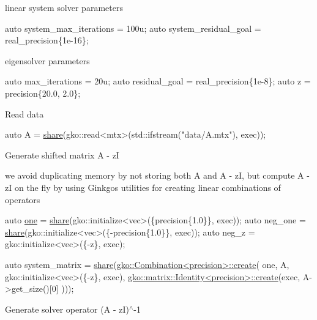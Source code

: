 linear system solver parameters


\begin{DoxyCode}
\textcolor{keyword}{auto} system\_max\_iterations = 100u;
\textcolor{keyword}{auto} system\_residual\_goal = real\_precision\{1e-16\};
\end{DoxyCode}


eigensolver parameters


\begin{DoxyCode}
\textcolor{keyword}{auto} max\_iterations = 20u;
\textcolor{keyword}{auto} residual\_goal = real\_precision\{1e-8\};
\textcolor{keyword}{auto} z = precision\{20.0, 2.0\};
\end{DoxyCode}


Read data


\begin{DoxyCode}
\textcolor{keyword}{auto} A = \hyperlink{namespacegko_a3ce296f73db0ff398bdea6009a3a5c58}{share}(gko::read<mtx>(std::ifstream(\textcolor{stringliteral}{"data/A.mtx"}), exec));
\end{DoxyCode}


Generate shifted matrix A -\/ zI
\begin{DoxyItemize}
\item we avoid duplicating memory by not storing both A and A -\/ zI, but compute A -\/ zI on the fly by using Ginkgo\textquotesingle{}s utilities for creating linear combinations of operators
\end{DoxyItemize}


\begin{DoxyCode}
\textcolor{keyword}{auto} \hyperlink{namespacegko_a0059e27f8f4bc348ff65c1e60caf47c8}{one} = \hyperlink{namespacegko_a3ce296f73db0ff398bdea6009a3a5c58}{share}(gko::initialize<vec>(\{precision\{1.0\}\}, exec));
\textcolor{keyword}{auto} neg\_one = \hyperlink{namespacegko_a3ce296f73db0ff398bdea6009a3a5c58}{share}(gko::initialize<vec>(\{-precision\{1.0\}\}, exec));
\textcolor{keyword}{auto} neg\_z = gko::initialize<vec>(\{-z\}, exec);

\textcolor{keyword}{auto} system\_matrix = \hyperlink{namespacegko_a3ce296f73db0ff398bdea6009a3a5c58}{share}(\hyperlink{classgko_1_1Combination}{gko::Combination<precision>::create}(
    one, A, gko::initialize<vec>(\{-z\}, exec),
    \hyperlink{classgko_1_1matrix_1_1Identity}{gko::matrix::Identity<precision>::create}(exec, A->get\_size()[0]
      )));
\end{DoxyCode}


Generate solver operator (A -\/ zI)$^\wedge$-\/1


